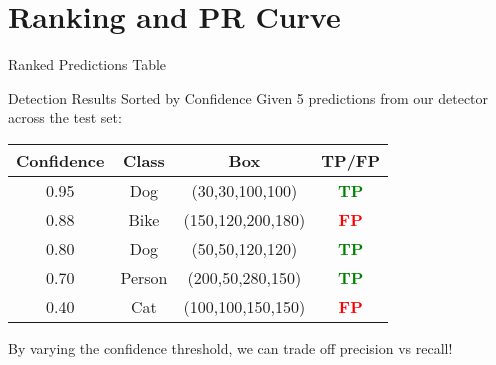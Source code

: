 \documentclass[usenames,dvipsnames]{beamer}
\begin{document}
	
	\section{Ranking and PR Curve}
	
	\begin{frame}{Ranked Predictions Table}
		\begin{examplebox}{Detection Results Sorted by Confidence}
			Given 5 predictions from our detector across the test set:
		\end{examplebox}
		
		\vspace{0.5em}
		\begin{center}
		\begin{tabular}{|c|c|c|c|}
		\hline
		\textbf{Confidence} & \textbf{Class} & \textbf{Box} & \textbf{TP/FP} \\
		\hline
		0.95 & Dog & (30,30,100,100) & \textcolor{green}{\textbf{TP}} \\
		\hline
		0.88 & Bike & (150,120,200,180) & \textcolor{red}{\textbf{FP}} \\
		\hline
		0.80 & Dog & (50,50,120,120) & \textcolor{green}{\textbf{TP}} \\
		\hline
		0.70 & Person & (200,50,280,150) & \textcolor{green}{\textbf{TP}} \\
		\hline
		0.40 & Cat & (100,100,150,150) & \textcolor{red}{\textbf{FP}} \\
		\hline
		\end{tabular}
		\end{center}
		
		\vspace{0.5em}
		\begin{keypointsbox}
		By varying the confidence threshold, we can trade off precision vs recall!
		\end{keypointsbox}
	\end{frame}
	
\end{document}

